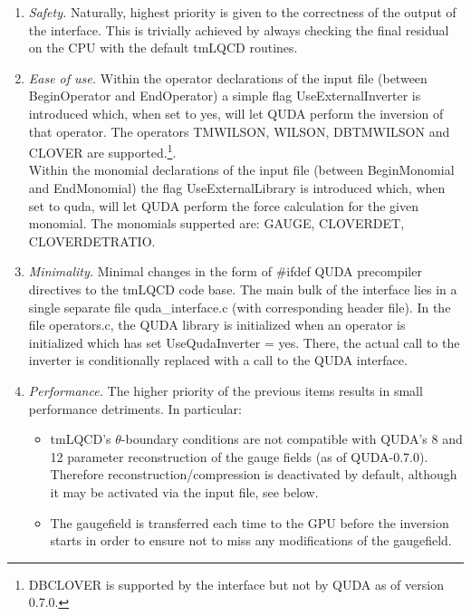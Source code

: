 \begin{enumerate}
	\item \emph{Safety.} Naturally, highest priority is given to the correctness of the output of the interface. 
	This is trivially achieved by always checking the final residual on the CPU with the default tmLQCD routines.
	\item \emph{Ease of use.} Within the operator declarations of the input file (between {\ttfamily BeginOperator} and {\ttfamily EndOperator}) a simple flag {\ttfamily UseExternalInverter} is introduced which, when set to {\ttfamily yes}, will let QUDA perform the inversion of that operator. The operators {\ttfamily TMWILSON, WILSON, DBTMWILSON} and {\ttfamily CLOVER} are supported.\footnote{{\ttfamily DBCLOVER} is supported by the interface but not by QUDA as of version 0.7.0.}.\\
    Within the monomial declarations of the input file (between {\ttfamily BeginMonomial} and {\ttfamily EndMonomial}) the flag {\ttfamily UseExternalLibrary} is introduced which, when set to {\ttfamily quda}, will let QUDA perform the force calculation for the given monomial.
	The monomials supperted are: {\ttfamily GAUGE, CLOVERDET, CLOVERDETRATIO}.
	\item \emph{Minimality.} Minimal changes in the form of {\ttfamily \#ifdef QUDA} precompiler directives to the tmLQCD code base. The main bulk of the interface lies in a single separate file {\ttfamily quda\_interface.c} (with corresponding header file). In the file {\ttfamily operators.c}, the QUDA library is initialized when an operator is initialized which has set {\ttfamily UseQudaInverter = yes}. There, the actual call to the inverter is conditionally replaced with a call to the QUDA interface.
	\item \emph{Performance.} The higher priority of the previous items results in small performance detriments. In particular:
	\begin{itemize}
		\item tmLQCD's $\theta$-boundary conditions are not compatible with QUDA's 8 and 12 parameter reconstruction of the gauge fields (as of QUDA-0.7.0). Therefore reconstruction/compression is deactivated by default, although it may be activated via the input file, see below.
		\item The gaugefield is transferred each time to the GPU before the inversion starts in order to ensure not to miss any modifications of the gaugefield.
	\end{itemize}
\end{enumerate}


